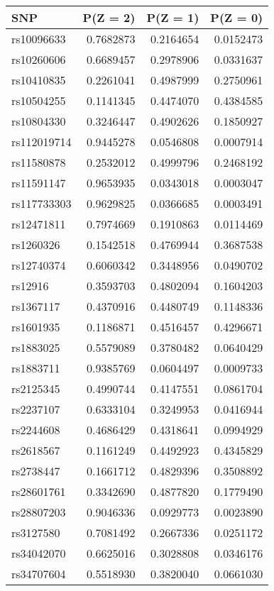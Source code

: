 \documentclass[
]{article}
\theoremstyle{plain}
\begin{document}
\begin{table}[H]
  \caption{Table of the marginal distribution of instruments, $P(Z = z), z=0,1,2$, estimated after preprocessing for analysis in Section \ref{cholesterol-on-heart-attack}}
  \label{tab:marginal-distribution-of-instruments-lung-cancer}
  \begin{minipage}{0.5\linewidth}
    \center
    \begin{table}[H]
\centering
\begin{tabular}{lrrr}
\toprule
SNP & P(Z = 2) & P(Z = 1) & P(Z = 0)\\
\midrule
rs10096633 & 0.7682873 & 0.2164654 & 0.0152473\\
rs10260606 & 0.6689457 & 0.2978906 & 0.0331637\\
rs10410835 & 0.2261041 & 0.4987999 & 0.2750961\\
rs10504255 & 0.1141345 & 0.4474070 & 0.4384585\\
rs10804330 & 0.3246447 & 0.4902626 & 0.1850927\\
\addlinespace
rs112019714 & 0.9445278 & 0.0546808 & 0.0007914\\
rs11580878 & 0.2532012 & 0.4999796 & 0.2468192\\
rs11591147 & 0.9653935 & 0.0343018 & 0.0003047\\
rs117733303 & 0.9629825 & 0.0366685 & 0.0003491\\
rs12471811 & 0.7974669 & 0.1910863 & 0.0114469\\
\addlinespace
rs1260326 & 0.1542518 & 0.4769944 & 0.3687538\\
rs12740374 & 0.6060342 & 0.3448956 & 0.0490702\\
rs12916 & 0.3593703 & 0.4802094 & 0.1604203\\
rs1367117 & 0.4370916 & 0.4480749 & 0.1148336\\
rs1601935 & 0.1186871 & 0.4516457 & 0.4296671\\
\addlinespace
rs1883025 & 0.5579089 & 0.3780482 & 0.0640429\\
rs1883711 & 0.9385769 & 0.0604497 & 0.0009733\\
rs2125345 & 0.4990744 & 0.4147551 & 0.0861704\\
rs2237107 & 0.6333104 & 0.3249953 & 0.0416944\\
rs2244608 & 0.4686429 & 0.4318641 & 0.0994929\\
\addlinespace
rs2618567 & 0.1161249 & 0.4492923 & 0.4345829\\
rs2738447 & 0.1661712 & 0.4829396 & 0.3508892\\
rs28601761 & 0.3342690 & 0.4877820 & 0.1779490\\
rs28807203 & 0.9046336 & 0.0929773 & 0.0023890\\
rs3127580 & 0.7081492 & 0.2667336 & 0.0251172\\
\addlinespace
rs34042070 & 0.6625016 & 0.3028808 & 0.0346176\\
rs34707604 & 0.5518930 & 0.3820040 & 0.0661030\\
\bottomrule
\end{tabular}
\end{table}



\end{minipage}
\end{table}
\end{document}
